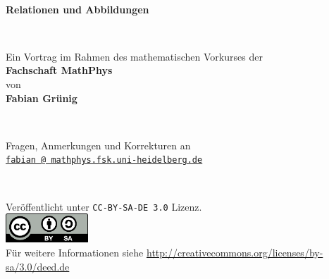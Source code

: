 
\begin{titlepage}

~

\begin{center}
  {\Huge \textbf{Relationen und Abbildungen}}
\end{center}

~\vfill~

\begin{center}
  \begin{center}
    Ein Vortrag im Rahmen des mathematischen Vorkurses der\\[0.5ex]
    \textbf{Fachschaft MathPhys}\\[0.5ex]
    von\\[0.5ex]
    \textbf{Fabian Grünig}
  \end{center}
\end{center}

~\vfill~

\begin{center}
    Fragen, Anmerkungen und Korrekturen an\\[1ex]
    \texttt{\href{mailto:fabian@mathphys.fsk.uni-heidelberg.de}{fabian @ mathphys.fsk.uni-heidelberg.de}}
\end{center}

~\vfill~

\begin{center}
Veröffentlicht unter \texttt{CC-BY-SA-DE 3.0} Lizenz.
\vspace{0.5cm}\\
  \includegraphics[height=31pt,width=88pt]{license.pdf}
\vspace{0.5cm}\\
Für weitere Informationen siehe
\url{http://creativecommons.org/licenses/by-sa/3.0/deed.de}
\end{center}

\end{titlepage}


\newpage
\tableofcontents
\thispagestyle{empty}
\newpage